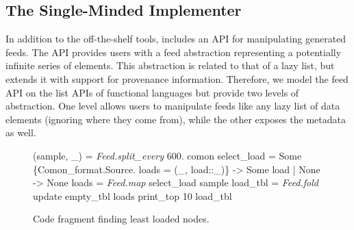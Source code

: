 

\subsection{The Single-Minded Implementer}

In addition to the off-the-shelf tools, \padsd{} includes an API for
manipulating generated feeds. The API provides 
users with a feed abstraction representing a potentially infinite
series of elements. This abstraction is related to that of a lazy
list, but extends it with support for provenance information. 
Therefore, we model the feed API on the
list APIs of functional languages
but provide two levels of abstraction. One level allows users to
manipulate feeds like any lazy list of data elements (ignoring
where they come from), while the other exposes the metadata as well. 



\begin{figure}[tb]
\begin{codebox}
 (sample, \_) = \textit{Feed.split_every} 600. comon 
 select_load = 
    Some \{Comon_format.Source.
          loads = (_, load::_)\} -> Some load
  | None -> None 
 loads    = \textit{Feed.map} select_load sample 
 load_tbl = \textit{Feed.fold} update empty_tbl loads 
  print_top 10 load_tbl
\end{codebox}
  \caption{Code fragment finding least loaded \planetlab nodes.}
\label{fig:sample-loads}
\end{figure}



